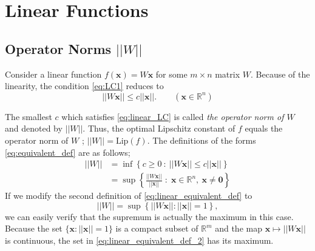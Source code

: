 \documentclass[12pt]{report}
\numberwithin{figure}{chapter}
\theoremstyle{plain}
\theoremstyle{definition}
\theoremstyle{corollary}
\theoremstyle{definition}
\theoremstyle{plain}
\theoremstyle{definition}
\theoremstyle{plain}
\newcommand\bs[1]{\ensuremath{\boldsymbol{#1}}}
\newcommand\bx{\ensuremath{\boldsymbol x}}
\newcommand\lip{\ensuremath{\text{Lip}}}
\begin{document}
\section{Linear Functions}

%
\subsection{Operator Norms \(||W||\)}

Consider a linear function \(f(\bx)=W\bx\) for some \(m\times n\) matrix \(W\).
Because of the linearity, the condition \eqref{eq:LC1} reduces to
\begin{equation}\label{eq:linear_LC}
||W\bx||\le c||\bx||.\qquad(\bx\in\mathbb R^n)
\end{equation}

The smallest \(c\) which satisfies \eqref{eq:linear_LC} is called \emph{the operator norm of \(W\)} and denoted by \(||W||\).
Thus, the optimal Lipschitz constant of \(f\) equals the operator norm of \(W\) ; \(||W||=\lip(f)\).
The definitions of the forms \eqref{eq:equivalent_def} are as follows;
\begin{equation}\label{eq:linear_equivalent_def}\begin{aligned}
||W||
&=\inf\left\{c\ge0\::\: ||W\bx||\le c||\bx||\right\}\\
&=\sup\left\{\frac{||W\bx||}{||\bx||}\;:\;\bx\in\mathbb R^n,\:\bx\neq\bs0\right\}
\end{aligned}\end{equation}
If we modify the second definition of \eqref{eq:linear_equivalent_def} to
\begin{equation}\label{eq:linear_equivalent_def_2}
||W||=\sup\left\{||W\bx||:||\bx||=1\right\},
\end{equation}
we can easily verify that the supremum is actually the maximum in this case.
Because the set \(\{\bx:||\bx||=1\}\) is a compact subset of \(\mathbb R^m\) and the map \(\bx\mapsto||W\bx||\) is continuous, the set in \eqref{eq:linear_equivalent_def_2} has its maximum.
\end{document}
